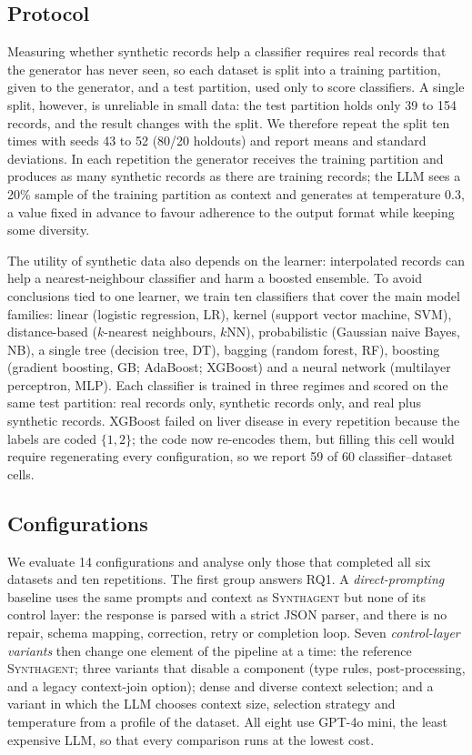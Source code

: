 \documentclass[conference]{IEEEtran}
\newcommand{\system}{\textsc{Synthagent}\xspace}
\begin{document}
\subsection{Protocol}
Measuring whether synthetic records help a classifier requires real records that the generator has never seen, so each dataset is split into a training partition, given to the generator, and a test partition, used only to score classifiers. A single split, however, is unreliable in small data: the test partition holds only 39 to 154 records, and the result changes with the split. We therefore repeat the split ten times with seeds 43 to 52 (80/20 holdouts) and report means and standard deviations. In each repetition the generator receives the training partition and produces as many synthetic records as there are training records; the LLM sees a 20\% sample of the training partition as context and generates at temperature 0.3, a value fixed in advance to favour adherence to the output format while keeping some diversity.

The utility of synthetic data also depends on the learner: interpolated records can help a nearest-neighbour classifier and harm a boosted ensemble. To avoid conclusions tied to one learner, we train ten classifiers that cover the main model families: linear (logistic regression, LR), kernel (support vector machine, SVM), distance-based ($k$-nearest neighbours, $k$NN), probabilistic (Gaussian naive Bayes, NB), a single tree (decision tree, DT), bagging (random forest, RF), boosting (gradient boosting, GB; AdaBoost; XGBoost) and a neural network (multilayer perceptron, MLP). Each classifier is trained in three regimes and scored on the same test partition: real records only, synthetic records only, and real plus synthetic records. XGBoost failed on liver disease in every repetition because the labels are coded $\{1,2\}$; the code now re-encodes them, but filling this cell would require regenerating every configuration, so we report 59 of 60 classifier--dataset cells.

\subsection{Configurations}
We evaluate 14 configurations and analyse only those that completed all six datasets and ten repetitions. The first group answers RQ1. A \emph{direct-prompting} baseline uses the same prompts and context as \system but none of its control layer: the response is parsed with a strict JSON parser, and there is no repair, schema mapping, correction, retry or completion loop. Seven \emph{control-layer variants} then change one element of the pipeline at a time: the reference \system; three variants that disable a component (type rules, post-processing, and a legacy context-join option); dense and diverse context selection; and a variant in which the LLM chooses context size, selection strategy and temperature from a profile of the dataset. All eight use GPT-4o mini, the least expensive LLM, so that every comparison runs at the lowest cost.
\end{document}

